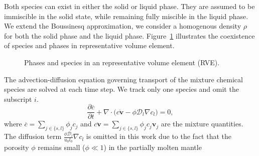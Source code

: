 Both species can exist in either the solid or liquid phase. They are assumed to 
be immiscible in the solid state, while remaining fully miscible in the liquid phase.
We extend the Boussinesq approximation, we consider a homogenous density
$\rho$ for both the solid phase and the liquid phase. Figure~\ref{fig:RVE} illustrates 
the coexistence of species and phases in representative volume element.
\begin{figure}[htb]
\centering\small
{}
\caption{Phases and species in an representative volume element (RVE).\label{fig:RVE}}
\end{figure}
The advection-diffusion equation governing transport of the mixture chemical species are solved at each time
step. We track only one species and omit the subscript $i$.
\begin{equation}\label{eq:specietransportsimplified}
\frac{\partial \overline{c}}{\partial t} + \nabla \cdot \big( \overline{ c \mathbf{v}} - \phi \mathcal{D}_{l} \nabla c_l \big) = 0,
\end{equation}
where $\overline{c} = \sum_{j\in \{s,l\}} \phi_j c_{j}$ 
and $\overline{c \mathbf{v}} = \sum_{j\in \{s,l\}} \phi_j c_{j} \mathbf{v}_j$
are the mixture quantities. The diffusion term $\frac{\phi \mathcal{D}_l}{u_0l_0} \nabla c_l$ 
is omitted in this work
due to the fact that the porosity $\phi$ remains small ($\phi \ll 1$) in the partially molten mantle
